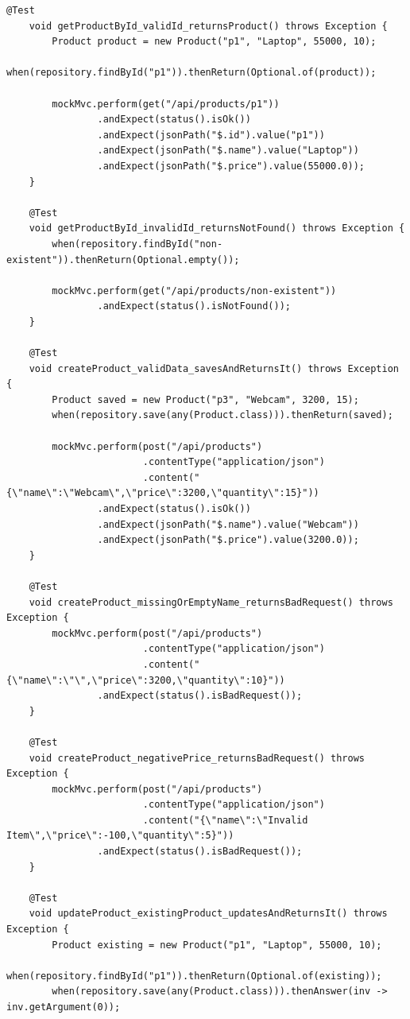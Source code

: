 \documentclass[12pt,a4paper]{article}
\begin{document}
\begin{lstlisting}[style=javastyle, caption={ProductControllerTest.java: Full suite of Positive and Negative Web Tests}]
    @Test
    void getProductById_validId_returnsProduct() throws Exception {
        Product product = new Product("p1", "Laptop", 55000, 10);
        when(repository.findById("p1")).thenReturn(Optional.of(product));

        mockMvc.perform(get("/api/products/p1"))
                .andExpect(status().isOk())
                .andExpect(jsonPath("$.id").value("p1"))
                .andExpect(jsonPath("$.name").value("Laptop"))
                .andExpect(jsonPath("$.price").value(55000.0));
    }

    @Test
    void getProductById_invalidId_returnsNotFound() throws Exception {
        when(repository.findById("non-existent")).thenReturn(Optional.empty());

        mockMvc.perform(get("/api/products/non-existent"))
                .andExpect(status().isNotFound());
    }

    @Test
    void createProduct_validData_savesAndReturnsIt() throws Exception {
        Product saved = new Product("p3", "Webcam", 3200, 15);
        when(repository.save(any(Product.class))).thenReturn(saved);

        mockMvc.perform(post("/api/products")
                        .contentType("application/json")
                        .content("{\"name\":\"Webcam\",\"price\":3200,\"quantity\":15}"))
                .andExpect(status().isOk())
                .andExpect(jsonPath("$.name").value("Webcam"))
                .andExpect(jsonPath("$.price").value(3200.0));
    }

    @Test
    void createProduct_missingOrEmptyName_returnsBadRequest() throws Exception {
        mockMvc.perform(post("/api/products")
                        .contentType("application/json")
                        .content("{\"name\":\"\",\"price\":3200,\"quantity\":10}"))
                .andExpect(status().isBadRequest());
    }

    @Test
    void createProduct_negativePrice_returnsBadRequest() throws Exception {
        mockMvc.perform(post("/api/products")
                        .contentType("application/json")
                        .content("{\"name\":\"Invalid Item\",\"price\":-100,\"quantity\":5}"))
                .andExpect(status().isBadRequest());
    }

    @Test
    void updateProduct_existingProduct_updatesAndReturnsIt() throws Exception {
        Product existing = new Product("p1", "Laptop", 55000, 10);
        when(repository.findById("p1")).thenReturn(Optional.of(existing));
        when(repository.save(any(Product.class))).thenAnswer(inv -> inv.getArgument(0));


\end{lstlisting}
\end{document}
